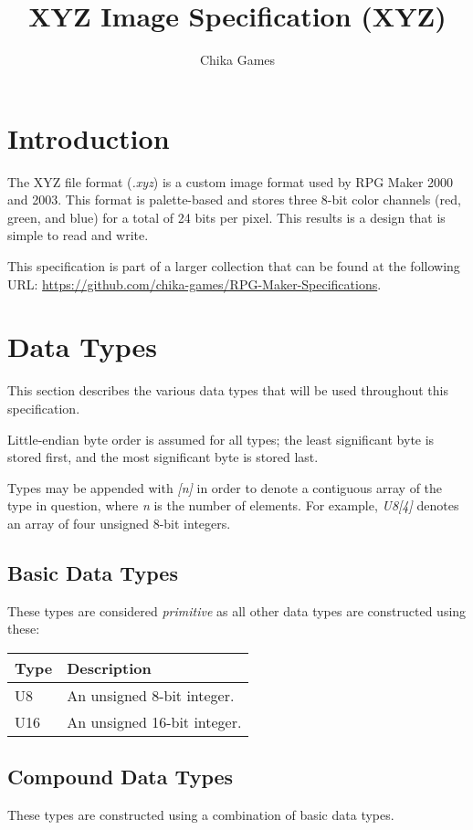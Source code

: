 

\title{XYZ Image Specification (XYZ)}
\author{Chika Games}


\specpreamble

\section{Introduction}
The XYZ file format (\textit{.xyz}) is a custom image format used by RPG Maker 2000 and 2003. This format is palette-based and stores three 8-bit color channels (red, green, and blue) for a total of 24 bits per pixel. This results is a design that is simple to read and write.

This specification is part of a larger collection that can be found at the following URL: \url{https://github.com/chika-games/RPG-Maker-Specifications}.

\section{Data Types}
This section describes the various data types that will be used throughout this specification.

Little-endian byte order is assumed for all types; the least significant byte is stored first, and the most significant byte is stored last.

Types may be appended with \textit{[n]} in order to denote a contiguous array of the type in question, where \textit{n} is the number of elements. For example, \textit{U8[4]} denotes an array of four unsigned 8-bit integers.

\subsection{Basic Data Types}
These types are considered \textit{primitive} as all other data types are constructed using these:

\begin{table}[h!]
\centering
\begin{tabular}{|l|l|}
\hline
\textbf{Type} & \textbf{Description}        \\ \hline
U8            & An unsigned 8-bit integer.  \\ \hline
U16           & An unsigned 16-bit integer. \\ \hline
\end{tabular}
\end{table}

\subsection{Compound Data Types}
These types are constructed using a combination of basic data types.

